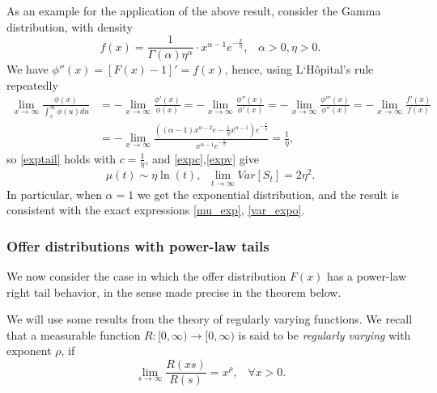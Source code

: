 \documentclass{article}
\numberwithin{equation}{section}
\begin{document}
As an example for the application of the above result, consider the Gamma distribution, with density
\begin{equation}\label{gammad}f(x)=\frac{1}{\Gamma(\alpha)\eta^\alpha}\cdot x^{\alpha-1}e^{-\frac{x}{\eta}},\;\;\;\alpha>0,\eta>0.\end{equation}
We have 
$\phi''(x)=[F(x)-1]'=f(x)$,
hence, using L`H\^opital's rule repeatedly
\begin{align*}\lim_{x\rightarrow \infty} \frac{\phi(x)}{\int_{x}^\infty \phi(u)du}&=-\lim_{x\rightarrow\infty}\frac{\phi'(x)}{\phi(x)}=-\lim_{x\rightarrow\infty}\frac{\phi''(x)}{\phi'(x)}=-\lim_{x\rightarrow\infty}\frac{\phi'''(x)}{\phi''(x)}=-\lim_{x\rightarrow\infty}\frac{f'(x)}{f(x)}\\&=-\lim_{x\rightarrow\infty}\frac{\left((\alpha-1)x^{\alpha-2}e-\frac{1}{\eta}x^{\alpha-1}\right)e^{-\frac{x}{\eta}}}{x^{\alpha-1}e^{-\frac{x}{\eta}}}=\frac{1}{\eta},\end{align*}
so \eqref{exptail} holds with $c=\frac{1}{\eta}$, and \eqref{expc},\eqref{expv} give
$$\mu(t)\sim \eta\ln(t),\;\;\lim_{t\rightarrow\infty}Var[S_t]=2\eta^2.$$
In particular, when $\alpha=1$ we get the exponential distribution, and the result is consistent with the exact expressions
\eqref{mu_exp}, \eqref{var_expo}.




\subsubsection{Offer distributions with power-law tails}

We now consider the case in which the offer distribution $F(x)$ has a power-law right tail behavior, in the sense made precise in the theorem below.

We will use some results from the theory of regularly varying functions. We recall \cite{Mladenovic} that a measurable function $R:[0,\infty)\rightarrow [0,\infty)$ is 
said to be {\it{regularly varying}} with exponent $\rho$, if 
$$\lim_{s\rightarrow \infty}\frac{R(xs)}{R(s)}=x^{\rho},\;\;\;\forall x>0.$$
\end{document}
